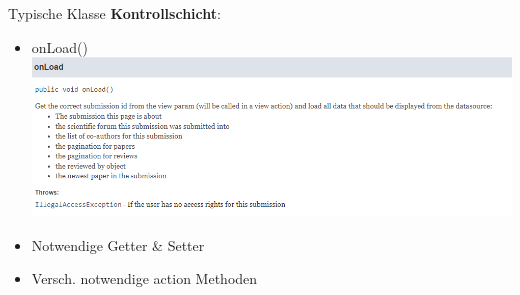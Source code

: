 \documentclass{beamer}
\begin{document}
\begin{frame}{Typische Klasse \textbf{Kontrollschicht}:}
\begin{itemize}
            \item onLoad()
            \centering
            \includegraphics[height=1.1\textheight]{graphics/backing/doc_onLoad}


            \item Notwendige Getter \& Setter
            \item Versch. notwendige action Methoden %
        \end{itemize}
    \end{frame}

\end{document}
